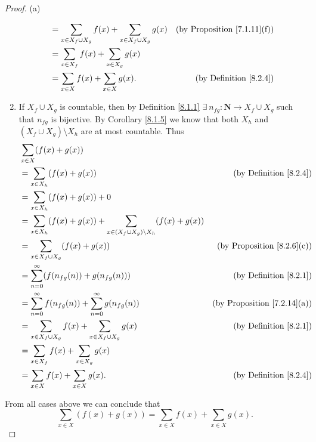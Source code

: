\begin{proof}{(a)}
\begin{enumerate}[label=(\Roman*)]
\begin{align*}
                   & = \sum_{x \in X_f \cup X_g} f(x) + \sum_{x \in X_f \cup X_g} g(x)                          & \text{(by Proposition \ref{7.1.11}(f))} \\
                   & = \sum_{x \in X_f} f(x) + \sum_{x \in X_g} g(x)                                                                                      \\
                   & = \sum_{x \in X} f(x) + \sum_{x \in X} g(x).                                               & \text{(by Definition \ref{8.2.4})}
              \end{align*}
        \item If \(X_f \cup X_g\) is countable, then by Definition \ref{8.1.1} \(\exists\ n_{fg} : \mathbf{N} \to X_f \cup X_g\) such that \(n_{fg}\) is bijective.
              By Corollary \ref{8.1.5} we know that both \(X_h\) and \((X_f \cup X_g) \setminus X_h\) are at most countable.
              Thus
              \begin{align*}
                   & \sum_{x \in X} (f(x) + g(x))                                                                                                         \\
                   & = \sum_{x \in X_h} (f(x) + g(x))                                                           & \text{(by Definition \ref{8.2.4})}      \\
                   & = \sum_{x \in X_h} (f(x) + g(x)) + 0                                                                                                 \\
                   & = \sum_{x \in X_h} (f(x) + g(x)) + \sum_{x \in (X_f \cup X_g) \setminus X_h} (f(x) + g(x))                                           \\
                   & = \sum_{x \in X_f \cup X_g} (f(x) + g(x))                                                  & \text{(by Proposition \ref{8.2.6}(c))}  \\
                   & = \sum_{n = 0}^\infty (f(n_{fg}(n)) + g(n_{fg}(n)))                                        & \text{(by Definition \ref{8.2.1})}      \\
                   & = \sum_{n = 0}^\infty f(n_{fg}(n)) + \sum_{n = 0}^\infty g(n_{fg}(n))                      & \text{(by Proposition \ref{7.2.14}(a))} \\
                   & = \sum_{x \in X_f \cup X_g} f(x) + \sum_{x \in X_f \cup X_g} g(x)                          & \text{(by Definition \ref{8.2.1})}      \\
                   & = \sum_{x \in X_f} f(x) + \sum_{x \in X_g} g(x)                                                                                      \\
                   & = \sum_{x \in X} f(x) + \sum_{x \in X} g(x).                                               & \text{(by Definition \ref{8.2.4})}
              \end{align*}
    \end{enumerate}
    From all cases above we can conclude that
    \[
        \sum_{x \in X} (f(x) + g(x)) = \sum_{x \in X} f(x) + \sum_{x \in X} g(x).
    \]
\end{proof}


